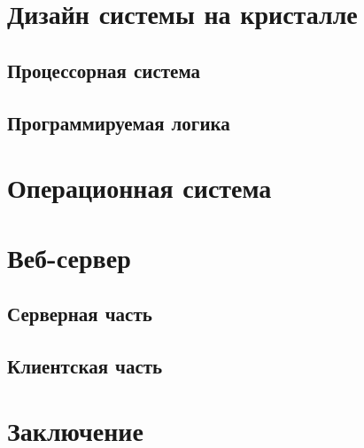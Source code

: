 \documentclass[a4paper, 14pt]{extarticle}
\begin{document}
\section{Дизайн системы на кристалле}
    
    \subsection{Процессорная система}
    
    \subsection{Программируемая логика}
    
    \newpage

\section{Операционная система}
    
    \newpage

\section{Веб-сервер}
    
    \subsection{Серверная часть}
    
    \subsection{Клиентская часть}
    
    \newpage

\section*{Заключение}
    
    \newpage

%
\printbibliography
    
\end{document}
